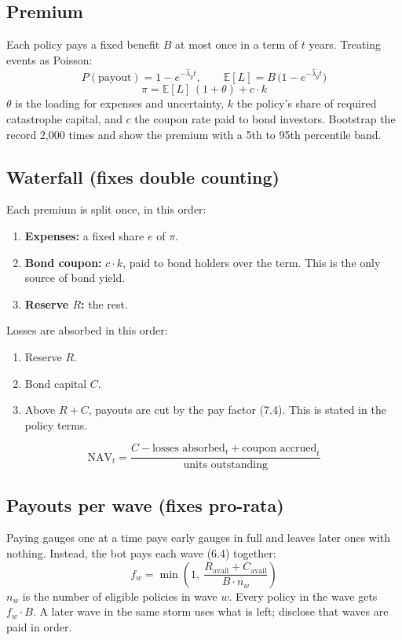 \documentclass[11pt]{article}
\begin{document}
\subsection{Premium}
Each policy pays a fixed benefit $B$ at most once in a term of $t$ years. Treating events as Poisson:
\[ P(\text{payout}) = 1 - e^{-\hat\lambda_g t}, \qquad \mathbb{E}[L] = B\,\bigl(1 - e^{-\hat\lambda_g t}\bigr) \]
\[ \pi = \mathbb{E}[L]\,(1 + \theta) + c \cdot k \]
$\theta$ is the loading for expenses and uncertainty, $k$ the policy's share of required catastrophe capital, and $c$ the coupon rate paid to bond investors. Bootstrap the record 2,000 times and show the premium with a 5th to 95th percentile band.

\subsection{Waterfall (fixes double counting)}
Each premium is split once, in this order:
\begin{enumerate}
\item \textbf{Expenses:} a fixed share $e$ of $\pi$.
\item \textbf{Bond coupon:} $c \cdot k$, paid to bond holders over the term. This is the only source of bond yield.
\item \textbf{Reserve $R$:} the rest.
\end{enumerate}
Losses are absorbed in this order:
\begin{enumerate}
\item Reserve $R$.
\item Bond capital $C$.
\item Above $R + C$, payouts are cut by the pay factor (7.4). This is stated in the policy terms.
\end{enumerate}
\[ \text{NAV}_t = \frac{C - \text{losses absorbed}_t + \text{coupon accrued}_t}{\text{units outstanding}} \]

\subsection{Payouts per wave (fixes pro-rata)}
Paying gauges one at a time pays early gauges in full and leaves later ones with nothing. Instead, the bot pays each wave (6.4) together:
\[ f_w = \min\left(1,\ \frac{R_{\text{avail}} + C_{\text{avail}}}{B \cdot n_w}\right) \]
$n_w$ is the number of eligible policies in wave $w$. Every policy in the wave gets $f_w \cdot B$. A later wave in the same storm uses what is left; disclose that waves are paid in order.
\end{document}
